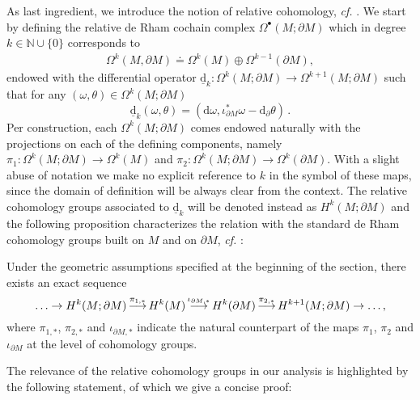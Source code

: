 As last ingredient, we introduce the notion of relative cohomology, {\it cf.} \cite{Bott-Tu-82}. We start by defining the relative de Rham cochain complex $\Omega^\bullet(M;\partial M)$  which in degree  $k\in\mathbb{N}\cup\{0\}$ corresponds to 
\begin{align*}
\Omega^k(M,\partial M)\doteq \Omega^k(M)\oplus\Omega^{k-1}(\partial M),
\end{align*}
endowed with the differential operator $\underline{\mathrm{d}}_k:\Omega^k(M;\partial M)\to\Omega^{k+1}(M;\partial M)$ such that for any $(\omega,\theta)\in\Omega^k(M;\partial M)$
\begin{equation}\label{Eq: relative-differential}
\underline{\mathrm{d}}_k(\omega,\theta)=(\mathrm{d}\omega,\iota^*_{\partial M}\omega-\mathrm{d}_\partial\theta)\,.
\end{equation}
Per construction, each $\Omega^k(M;\partial M)$ comes endowed naturally with the projections on each of the defining components, namely $\pi_1:\Omega^k(M;\partial M)\to\Omega^k(M)$ and $\pi_2:\Omega^k(M;\partial M)\to\Omega^k(\partial M)$. With a slight abuse of notation we make no explicit reference to $k$ in the symbol of these maps, since the domain of definition will be always clear from the context. The relative cohomology groups associated to $\underline{\mathrm{d}}_k$ will be denoted instead as $H^k(M;\partial M)$ and the following proposition characterizes the relation with the standard de Rham cohomology groups built on $M$ and on $\partial M$, {\it cf.} \cite[Prop. 6.49]{Bott-Tu-82}:

\begin{proposition}\label{Prop: long exact sequence}
	Under the geometric assumptions specified at the beginning of the section, there exists an exact sequence
	\begin{equation}
	\ldots\to H^k(M;\partial M)\operatornamewithlimits{\longrightarrow}^{\pi_{1,*}} H^k(M) \operatornamewithlimits{\longrightarrow}^{\iota_{\partial M,*}} H^k(\partial M)\operatornamewithlimits{\longrightarrow}^{\pi_{2,*}} H^{k+1}(M;\partial M)\to\ldots,
	\end{equation}
	where $\pi_{1,*}$, $\pi_{2,*}$ and $\iota_{\partial M,*}$ indicate the natural counterpart of the maps $\pi_1$, $\pi_2$ and $\iota_{\partial M}$ at the level of cohomology groups.
\end{proposition}

\noindent The relevance of the relative cohomology groups in our analysis is highlighted by the following statement, of which we give a concise proof:

